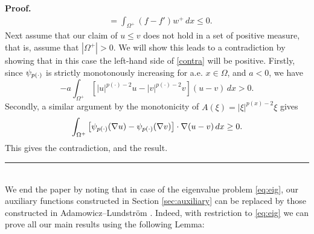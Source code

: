 \documentclass[12pt]{article}
\newenvironment{proof}[1][Proof]{\textbf{#1.} }{\ \rule{0.5em}{0.5em}}
\numberwithin{komcounter}{section}
\begin{document}
\begin{proof}
\begin{align}
\nonumber &= \int_{\Omega^+} (f-f')w^+\,dx \leq 0.
\end{align}
Next assume that our claim of $u \leq v$ does not hold in a set of positive measure, that is, assume that $|\Omega^+| > 0$. We will show this leads to a contradiction by showing that in this case the left-hand side of \eqref{contra} will be positive.
Firstly, since $\psi_{p(\cdot)}$ is strictly monotonously increasing for a.e. $x \in \Omega$, and $a<0$, we have
\[
- a \int_{\Omega^+} \left[|u|^{p(\cdot)-2}u - |v|^{p(\cdot)-2}v\right](u-v)\,dx > 0.
\]
Secondly, a similar argument by the monotonicity of $A(\xi) = |\xi|^{p(x)-2}\xi$ gives
\[
\int_{\Omega^+} \left[\psi_{p(\cdot)}(\nabla u) - \psi_{p(\cdot)}(\nabla v)\right]\cdot \nabla (u-v)\,dx \geq 0.
\]
This gives the contradiction, and the result.
\end{proof}\\


We end the paper by noting that in case of the eigenvalue problem \eqref{eq:eig},
our auxiliary functions constructed in Section \ref{sec:auxiliary} can be replaced by those constructed in
Adamowicz--Lundstr\"om \cite[Lemma 4.1]{AL16}.
Indeed, with restriction to \eqref{eq:eig} we can prove all our main results using the following Lemma:

\end{document}
